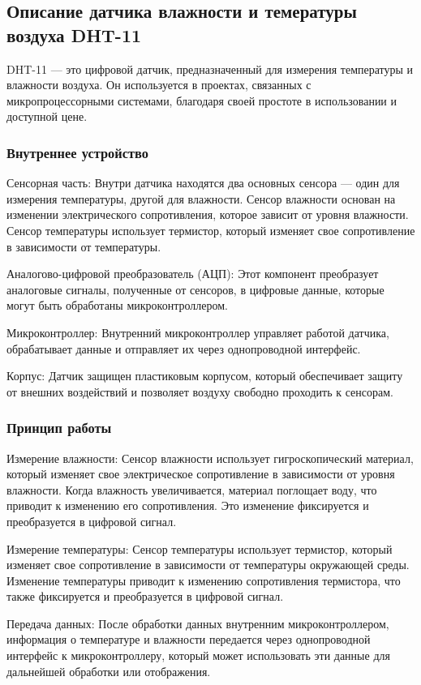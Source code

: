 \documentclass{bmstu}
\begin{document}
    \subsection{Описание датчика влажности и темературы воздуха DHT-11}
    DHT-11\cite{DHT11TemperatureHumiditySensor} — это цифровой датчик, предназначенный для измерения температуры и влажности воздуха. Он используется в проектах, связанных с микропроцессорными системами, благодаря своей простоте в использовании и доступной цене.

    \subsubsection{Внутреннее устройство}
    Сенсорная часть: Внутри датчика находятся два основных сенсора — один для измерения температуры, другой для влажности. Сенсор влажности основан на изменении электрического сопротивления, которое зависит от уровня влажности. Сенсор температуры использует термистор, который изменяет свое сопротивление в зависимости от температуры.

    Аналогово-цифровой преобразователь (АЦП): Этот компонент преобразует аналоговые сигналы, полученные от сенсоров, в цифровые данные, которые могут быть обработаны микроконтроллером.

    Микроконтроллер: Внутренний микроконтроллер управляет работой датчика, обрабатывает данные и отправляет их через однопроводной интерфейс.

    Корпус: Датчик защищен пластиковым корпусом, который обеспечивает защиту от внешних воздействий и позволяет воздуху свободно проходить к сенсорам.

    \subsubsection{Принцип работы}
    Измерение влажности: Сенсор влажности использует гигроскопический материал, который изменяет свое электрическое сопротивление в зависимости от уровня влажности. Когда влажность увеличивается, материал поглощает воду, что приводит к изменению его сопротивления. Это изменение фиксируется и преобразуется в цифровой сигнал.

    Измерение температуры: Сенсор температуры использует термистор, который изменяет свое сопротивление в зависимости от температуры окружающей среды. Изменение температуры приводит к изменению сопротивления термистора, что также фиксируется и преобразуется в цифровой сигнал.

    Передача данных: После обработки данных внутренним микроконтроллером, информация о температуре и влажности передается через однопроводной интерфейс к микроконтроллеру, который может использовать эти данные для дальнейшей обработки или отображения.
\end{document}
